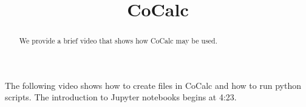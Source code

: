 \documentclass{ximera}
\title{CoCalc}
\begin{document}
  
\begin{abstract}  
We provide a brief video that shows how CoCalc may be used.
\end{abstract}  
\maketitle

The following video shows how to create files in CoCalc and how to run python scripts. The introduction to Jupyter notebooks begins at 4:23.

\end{document}
